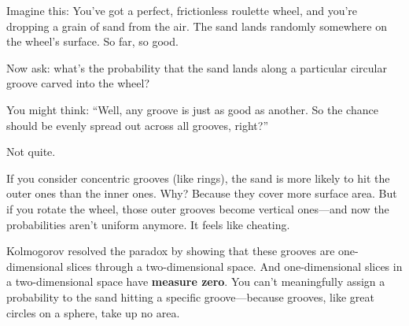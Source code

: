Imagine this: You’ve got a perfect, frictionless roulette wheel, and you're dropping a grain of sand from the air. The sand lands randomly somewhere on the wheel’s surface. So far, so good.

Now ask: what’s the probability that the sand lands along a particular circular groove carved into the wheel?

You might think: “Well, any groove is just as good as another. So the chance should be evenly spread out across all grooves, right?”

Not quite.

If you consider concentric grooves (like rings), the sand is more likely to hit the outer ones than the inner ones. Why? Because they cover more surface area. But if you rotate the wheel, those outer grooves become vertical ones—and now the probabilities aren’t uniform anymore. It feels like cheating.

Kolmogorov resolved the paradox by showing that these grooves are one-dimensional slices through a two-dimensional space. And one-dimensional slices in a two-dimensional space have \textbf{measure zero}. You can’t meaningfully assign a probability to the sand hitting a specific groove—because grooves, like great circles on a sphere, take up no area.



